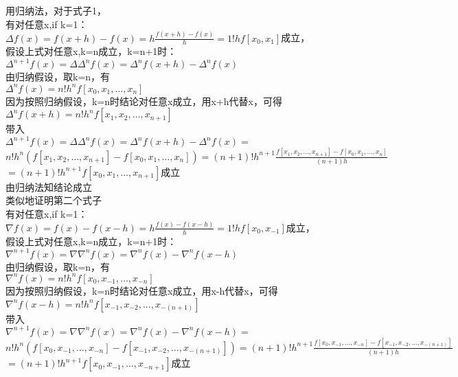 \documentclass[a4paper]{article}
\begin{document}
用归纳法，对于式子1，\\
有对任意x,if k=1：\\
$\Delta f(x) =f(x+h) - f(x) =h \frac{f(x+h)-f(x)}{h}= 1! h f[x_0, x_1]$成立，\\
假设上式对任意x,k=n成立，k=n+1时：\\
$\Delta^{n+1} f(x) = \Delta \Delta^n f(x) = \Delta^n f(x+h) - \Delta^n f(x)$\\
由归纳假设，取k=n，有\\
$\Delta^n f(x) = n! h^n f[x_0, x_1, \ldots, x_n]$\\
因为按照归纳假设，k=n时结论对任意x成立，用x+h代替x，可得\\
$\Delta^n f(x+h) = n! h^n f[x_1, x_2, \ldots, x_{n+1}]$\\
带入\\
$\Delta^{n+1} f(x) = \Delta \Delta^n f(x) = \Delta^n f(x+h) - \Delta^n f(x)=$\\
$n! h^n (f[x_1, x_2, \ldots, x_{n+1}]-f[x_0, x_1, \ldots, x_n])=(n+1)! h^{n+1}\frac{f[x_1, x_2, \ldots, x_{n+1}]-f[x_0, x_1, \ldots, x_n]}{(n+1)h} $\\
$=(n+1)! h^{n+1} f[x_0, x_1, \ldots, x_{n+1}]$成立\\
由归纳法知结论成立\\

类似地证明第二个式子\\
有对任意x,if k=1：\\
$\nabla f(x) =f(x) - f(x-h) =h \frac{f(x)-f(x-h)}{h}= 1! h f[x_0, x_{-1}]$成立，\\
假设上式对任意x,k=n成立，k=n+1时：\\
$\nabla^{n+1} f(x) = \nabla \nabla^n f(x) = \nabla^n f(x) - \nabla^n f(x-h)$\\
由归纳假设，取k=n，有\\
$\nabla^n f(x) = n! h^n f[x_0, x_{-1}, \ldots, x_{-n}]$\\
因为按照归纳假设，k=n时结论对任意x成立，用x-h代替x，可得\\
$\nabla^n f(x-h) = n! h^n f[x_{-1}, x_{-2}, \ldots, x_{-(n+1)}]$\\
带入\\
$\nabla^{n+1} f(x) = \nabla \nabla^n f(x) = \nabla^n f(x) - \nabla^n f(x-h)=$\\
$n! h^n (f[x_0, x_{-1}, \ldots, x_{-n}]-f[x_{-1}, x_{-2}, \ldots, x_{-(n+1)}])=(n+1)! h^{n+1}\frac{f[x_0, x_{-1}, \ldots, x_{-n}]-f[x_{-1}, x_{-2}, \ldots, x_{-(n+1)}]}{(n+1)h} $\\
$=(n+1)! h^{n+1} f[x_0, x_{-1}, \ldots, x_{-{n+1}}]$成立\\
\end{document}
